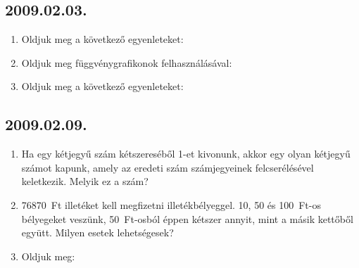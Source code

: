 \subsection*{2009.02.03.}
\begin{enumerate}
\item Oldjuk meg a következő egyenleteket:


\item Oldjuk meg függvénygrafikonok felhasználásával:


\item Oldjuk meg a következő egyenleteket: 


\end{enumerate}


\subsection*{2009.02.09.}
\begin{enumerate}
\item Ha egy kétjegyű szám kétszereséből 1-et kivonunk, akkor egy olyan kétjegyű számot kapunk, amely az eredeti szám számjegyeinek felcserélésével keletkezik. Melyik ez a szám?
\item 76870~Ft illetéket kell megfizetni illetékbélyeggel. 10, 50 és 100~Ft-os
bélyegeket veszünk, 50~Ft-osból éppen kétszer annyit, mint a másik kettőből együtt. Milyen esetek lehetségesek?
\item Oldjuk meg:
\end{enumerate}


